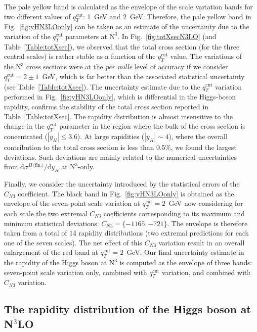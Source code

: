 \documentclass[12pt]{article}
\DeclareRobustCommand{\qtcut}{\ensuremath{q_T^\mathrm{cut}}\xspace}
\DeclareRobustCommand{\rd}{\ensuremath{\mathrm{d}}}
\DeclareRobustCommand{\fin}{\text{(fin.)}\xspace}
\DeclareRobustCommand{\LO}{\text{LO}\xspace}
\DeclareRobustCommand{\N}[1]{\ensuremath{\text{N}^{#1}}} %
\begin{document}
The pale yellow band is calculated as the envelope of the scale variation bands for two different values of $\qtcut$: 1~GeV and 2~GeV. Therefore, the pale yellow band in Fig.~\ref{fig:yHN3LOonly} can be taken as an estimate of the uncertainty due to the variation of the $\qtcut$ parameters at \N3\LO. In Fig.~\ref{fig:totXsecN3LO} (and Table~\ref{Table:totXsec}), we observed that the total cross section (for the three central scales) is rather stable as a function of the $\qtcut$ value. The variations of the \N3\LO cross sections were at the \textit{per mille} level of accuracy if we consider  $\qtcut=2 \pm 1$~GeV, which is far better than the associated statistical uncertainty (see Table~\ref{Table:totXsec}). The uncertainty estimate due to the $\qtcut$ variation performed in Fig.~\ref{fig:yHN3LOonly}, which is differential in the Higgs-boson rapidity, confirms the stability of the total cross section reported in Table~\ref{Table:totXsec}. 
The rapidity distribution is almost insensitive to the change in the $\qtcut$ parameter in the region where the bulk of the cross section is concentrated ($|y_{H}| \leq 3.6$). At large rapidities ($|y_{H}| \sim 4$), where the overall contribution to the total cross section is less than $0.5\%$, we found the largest deviations. Such deviations are mainly related to the numerical uncertainties from $\rd\sigma^{H\,\fin}/\rd y_H$ at  \N3\LO-only.
 
Finally, we consider the uncertainty introduced by the statistical errors of the $C_{N3}$ coefficient. The black band in Fig.~\ref{fig:yHN3LOonly} is obtained as the envelope of the seven-point scale variation at $\qtcut=2$~GeV now considering for each scale the two extremal $C_{N3}$ coefficients corresponding to its maximum and minimum statistical deviations: $C_{N3} =\{-1165,-721\}$. The envelope is therefore taken from a total of 14 rapidity distributions (two extremal predictions for each one of the seven scales). The net effect of this $C_{N3}$ variation result in an overall enlargement of the red band at $\qtcut=2$~GeV. Our final uncertainty estimate in the rapidity of the Higgs boson at \N3\LO is computed as the envelope of three bands: seven-point scale variation only, combined with $\qtcut$ variation, and combined with $C_{N3}$ variation. 


\subsection{The rapidity distribution of the Higgs boson at \texorpdfstring{N${}^\text{3}$LO}{N3LO}}
\label{sec:results}
\end{document}
